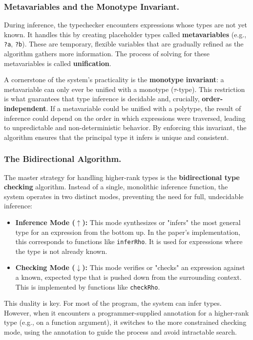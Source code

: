 \subsubsection{Metavariables and the Monotype Invariant.}
During inference, the typechecker encounters expressions whose types are not yet known. It handles this by creating placeholder types called \textbf{metavariables} (e.g., \texttt{?a}, \texttt{?b}). These are temporary, flexible variables that are gradually refined as the algorithm gathers more information. The process of solving for these metavariables is called \textbf{unification}.

A cornerstone of the system's practicality is the \textbf{monotype invariant}: a metavariable can only ever be unified with a monotype ($\tau$-type). This restriction is what guarantees that type inference is decidable and, crucially, \textbf{order-independent}. If a metavariable could be unified with a polytype, the result of inference could depend on the order in which expressions were traversed, leading to unpredictable and non-deterministic behavior. By enforcing this invariant, the algorithm ensures that the principal type it infers is unique and consistent.

\subsubsection{The Bidirectional Algorithm.}
The master strategy for handling higher-rank types is the \textbf{bidirectional type checking} algorithm. Instead of a single, monolithic inference function, the system operates in two distinct modes, preventing the need for full, undecidable inference:
\begin{itemize}
    \item \textbf{Inference Mode ($\uparrow$):} This mode synthesizes or "infers" the most general type for an expression from the bottom up. In the paper's implementation, this corresponds to functions like \texttt{inferRho}. It is used for expressions where the type is not already known.
    \item \textbf{Checking Mode ($\downarrow$):} This mode verifies or "checks" an expression against a known, expected type that is pushed down from the surrounding context. This is implemented by functions like \texttt{checkRho}.
\end{itemize}
This duality is key. For most of the program, the system can infer types. However, when it encounters a programmer-supplied annotation for a higher-rank type (e.g., on a function argument), it switches to the more constrained checking mode, using the annotation to guide the process and avoid intractable search.

